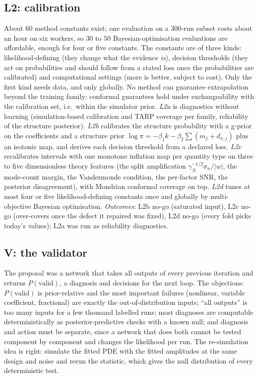 \documentclass[11pt]{article}
\theoremstyle{plain}
\theoremstyle{definition}
\theoremstyle{remark}
\newcommand{\gN}{\gamma_{N}}                %
\newcommand{\noise}{\sigma_{n}}             %
\newcommand{\abs}[1]{\lvert#1\rvert}
\begin{document}
\subsection{L2: calibration}
About $60$ method constants exist; one evaluation on a $300$-run subset costs about an hour on six workers, so $30$ to $50$ Bayesian-optimisation evaluations are affordable, enough for four or five constants. The constants are of three kinds: likelihood-defining (they change what the evidence \emph{is}), decision thresholds (they act on probabilities and should follow from a stated loss once the probabilities are calibrated) and computational settings (more is better, subject to cost). Only the first kind needs data, and only globally. No method can guarantee extrapolation beyond the training family: conformal guarantees hold under exchangeability with the calibration set, i.e.\ within the simulator prior.
\emph{L2a} is diagnostics without learning (simulation-based calibration and TARP coverage per family, reliability of the structure posterior). \emph{L2b} calibrates the structure probability with a g-prior on the coefficients and a structure prior $\log\pi=-\beta_1k-\beta_2\sum(m_j+d_{x,j})$ plus an isotonic map, and derives each decision threshold from a declared loss.
\emph{L2c} recalibrates intervals with one monotone inflation map per quantity type on three to five dimensionless theory features (the split amplification $\gN^{-1/2}\noise/\abs w$, the mode-count margin, the Vandermonde condition, the per-factor SNR, the posterior disagreement), with Mondrian conformal coverage on top.
\emph{L2d} tunes at most four or five likelihood-defining constants once and globally by multi-objective Bayesian optimisation. \emph{Outcomes}: L2b no-go (saturated input), L2c no-go (over-covers once the defect it repaired was fixed), L2d no-go (every fold picks today's values); L2a was run as reliability diagnostics.

\subsection{V: the validator}
The proposal was a network that takes all outputs of every previous iteration and returns $P(\text{valid})$, a diagnosis and decisions for the next loop. The objections: $P(\text{valid})$ is prior-relative and the most important failures (nonlinear, variable coefficient, fractional) are exactly the out-of-distribution inputs;
``all outputs'' is too many inputs for a few thousand labelled runs; most diagnoses are computable deterministically as posterior-predictive checks with a known null; and diagnosis and action must be separate, since a network that does both cannot be tested component by component and changes the likelihood per run.
The re-simulation idea is right: simulate the fitted PDE with the fitted amplitudes at the same design and noise and rerun the statistic, which gives the null distribution of every deterministic test.
\end{document}
